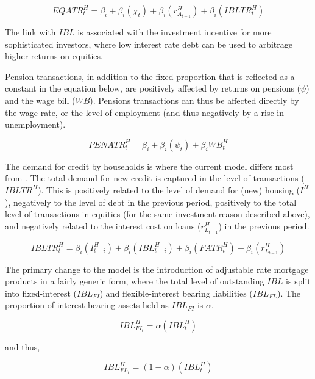 \documentclass[
]{book}
\begin{document}
\begin{equation}
EQATR^H_t = \beta _i + \beta _i(\chi _t) + \beta _i(r^H_{A_{t-1}}) + \beta _i(IBLTR^H_t )
\end{equation}

The link with \(IBL\) is associated with the investment incentive for more sophisticated
investors, where low interest rate debt can be used to arbitrage higher returns on
equities.

Pension transactions, in addition to the fixed proportion that is reflected
as a constant in the equation below, are positively affected by returns on pensions (\(\psi\))
and the wage bill (\(WB\)). Pensions transactions can thus be affected directly by the
wage rate, or the level of employment (and thus negatively by a rise in unemployment).

\begin{equation}
PENATR^H_t = \beta _i + \beta _i(\psi _t) + \beta _iWB^H_t
\end{equation}

The demand for credit by households is where the current model differs most from
\citet{byrialsenraza2019empirical}. The total demand for new credit is captured
in the level of transactions (\(IBLTR^H\)). This is positively related to the level of demand for (new) housing (\(I^H\)), negatively to the level of debt in the previous period, positively to the total level of transactions in equities (for the same investment reason described above), and negatively related to the interest cost on loans (\(r^H_{L_{t-1}}\)) in the previous period.

\begin{equation}
IBLTR^H_t = \beta _i(I^H_{t-i}) + \beta _i(IBL^H_{t-i}) + \beta _i(FATR^H_t) + \beta _i(r^H_{L_{t-1}})
\end{equation}

The primary change to the model is the introduction of adjustable rate mortgage products in a
fairly generic form, where the total level of outstanding \(IBL\) is split into
fixed-interest (\(IBL_{FI}\)) and flexible-interest bearing liabilities (\(IBL_{FL}\)). The proportion
of interest bearing assets held as \(IBL_{FI}\) is \(\alpha\).

\begin{equation}
IBL^H_{FI_t} = \alpha(IBL^H_t)
\end{equation}

and thus,

\begin{equation}
IBL^H_{FL_t} = (1-\alpha)(IBL^H_t)
\end{equation}
\end{document}
